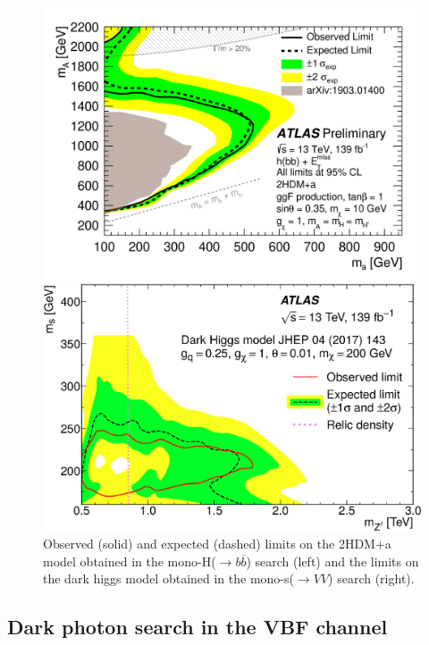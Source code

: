 \documentclass{moriond}
\begin{document}
\begin{figure} [htb]
\begin{minipage}{0.45\linewidth}
\centerline{\includegraphics[width=0.9\linewidth]{monoh}}
\end{minipage}
\begin{minipage}{0.45\linewidth}
\centerline{\includegraphics[width=0.9\linewidth]{monos}}
\end{minipage}
\caption[]{Observed (solid) and expected (dashed) limits on the 2HDM+a model obtained in the mono-H($\rightarrow b\overline{b}$) search (left) and the limits on the dark higgs model obtained in the mono-s($\rightarrow VV$) search (right).}
\label{fig:mono_h_s}
\end{figure}

\subsection{Dark photon search in the VBF channel}
\end{document}
